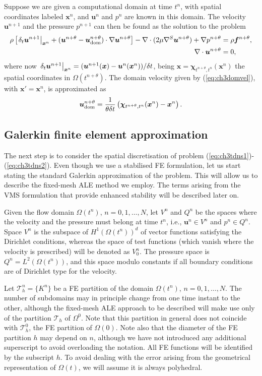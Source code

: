 \documentclass[11pt,a4paper,oneside,reqno]{amsart}
\newcommand{\Eq}[1]{(\ref{eq:#1})}
\newcommand{\sbm}[1]  {\mbox{{\boldmath{$\scriptstyle{#1}$}}}}
\def\map{{\bm\chi}}
\def\x{{\bm x}}
\def\u{{\bm u}}
\def\f{{\bm f}}
\def\dt{{\delta t}}
\begin{document}
Suppose we are given a computational domain at time $t^n$, with spatial coordinates labeled $\x^n$, and $\u^n$ and $p^n$ are known in this domain. The velocity $\u^{n+1}$ and the pressure $p^{n+1}$ can then be found as the solution
to the problem
\begin{align}
\rho \left[\left.\delta_t \u^{n+1}\right\vert_{{\sbm x}^n} + (\u^{n+\theta}-{\u_{\rm dom}^{n+\theta}})\cdot\nabla\u^{n+\theta} \right] 
- \nabla\cdot(2\mu\nabla^S\u^{n+\theta}) + \nabla p^{n+\theta} & = \rho\f^{n+\theta}, \label{eq:ch3tdns1}\\
\nabla\cdot\u^{n+\theta} & = 0, \label{eq:ch3tdns2}
\end{align}
where now $\left.\delta_t \u^{n+1}\right\vert_{{\sbm x}^n} = (\u^{n+1}(\x) - \u^{n}(\x^n))/\dt$, 
being $\x = \map_{t^{n+\theta},t^n}(\x^n)$ the spatial coordinates in $\Omega(t^{n+\theta})$.
The domain velocity given by \Eq{ch3domvel}, with $\x' = \x^n$, is approximated as
\begin{align}
\u_{\rm dom}^{n+\theta} = \frac{1}{\theta\dt}\left(\map_{t^{n+\theta},t^n}(\x^n) - \x^n\right).\label{eq:ch3meshvel}  
\end{align}

\subsection{Galerkin finite element approximation}\label{ch3fudis}

The next step is to consider the spatial discretisation of problem \Eq{ch3tdns1}-\Eq{ch3tdns2}.  Even though we use a stabilised FE formulation, let us start stating the standard Galerkin approximation of the problem. This will allow us to describe the fixed-mesh ALE method we employ. The terms arising from the VMS formulation that provide enhanced stability will be described later on.

Given the flow domain $\Omega(t^{n})$, $n=0,1,\dots, N$, let $V^n$ and $Q^n$ be the spaces where the velocity and the pressure must belong at time $t^n$, i.e., $\u^n \in V^n$ and $p^n\in Q^n$. Space $V^n$ is the subspace of $H^1(\Omega(t^n))^d$ of vector functions satisfying the Dirichlet conditions, whereas the space of test functions (which vanish where the velocity is prescribed) will be denoted as $V^n_0$. The pressure space is $Q^n = L^2(\Omega(t^n))$, and this space modulo constants if all boundary conditions are of Dirichlet type for the velocity. 

Let ${\mathcal{T}}_h^{n} = \{ K^n \}$ be a FE partition of the domain $\Omega(t^{n})$, $n=0,1,\dots, N$. The number of subdomains may in principle change from one time instant to the other, although the fixed-mesh ALE approach to be described will make use only of the partition ${\mathcal{T}}_h$ of $\Omega^0$. Note that this partition in general does not coincide with ${\mathcal{T}}_h^0$, the FE partition of $\Omega(0)$. Note also that the diameter of the FE partition $h$ may depend on $n$, although we have not introduced any additional superscript to avoid overloading the notation. All FE functions will be identified by the subscript $h$. To avoid dealing with the error arising from the geometrical representation of $\Omega(t)$, we will assume it is always polyhedral.
\end{document}
